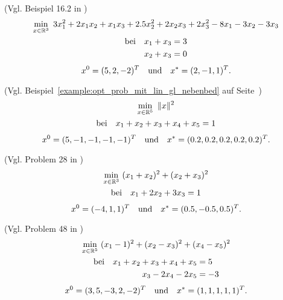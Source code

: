 \begin{testproblem}
\label{test_prob:prob_A_nocedal}
(Vgl. Beispiel 16.2 in \cite[S.~452]{nocedal})
\begin{gather}
\min_{x\in\mathbb{R}^3}\ 3 x_1^2 + 2 x_1 x_2 + x_1 x_3 + 2.5 x_2^2 + 2 x_2 x_3 + 2 x_3^2 - 8 x_1 - 3 x_2 - 3 x_3 \notag \\
\begin{split}
\text{bei}\quad x_1 + x_3 & = 3 \\
x_2 + x_3 & = 0 \\
\end{split}
\end{gather}
\begin{equation*}
x^0 = (5, 2, -2)^T \quad\text{und}\quad x^* = (2, -1, 1)^T.
\end{equation*}
\end{testproblem}

\begin{testproblem}
(Vgl. Beispiel~\ref{example:opt_prob_mit_lin_gl_nebenbed} auf Seite~\pageref{example:opt_prob_mit_lin_gl_nebenbed})
\begin{gather}
\min_{x\in\mathbb{R}^5}\ \| x \|^2 \notag \\
\begin{split}
\text{bei}\quad x_1 + x_2 + x_3 + x_4 + x_5 & = 1 \\
\end{split}
\end{gather}
\begin{equation*}
x^0 = (5, -1, -1, -1, -1)^T \quad\text{und}\quad x^* = (0.2, 0.2, 0.2, 0.2, 0.2)^T.
\end{equation*}
\end{testproblem}

\begin{testproblem}
(Vgl. Problem 28 in \cite[S.~51]{hock})
\begin{gather}
\min_{x\in\mathbb{R}^3}\ (x_1 + x_2)^2 + (x_2 + x_3)^2 \notag \\
\begin{split}
\text{bei}\quad x_1 + 2 x_2 + 3 x_3 & = 1 \\
\end{split}
\end{gather}
\begin{equation*}
x^0 = (-4, 1, 1)^T \quad\text{und}\quad x^* = (0.5, -0.5, 0.5)^T.
\end{equation*}
\end{testproblem}

\begin{testproblem}
(Vgl. Problem 48 in \cite[S.~71]{hock})
\begin{gather}
\min_{x\in\mathbb{R}^5}\ (x_1 - 1)^2 + (x_2 - x_3)^2 + (x_4 - x_5)^2 \notag \\
\begin{split}
\text{bei}\quad x_1 + x_2 + x_3 + x_4 + x_5 & = 5 \\
x_3 - 2 x_4 - 2 x_5 & = -3 \\
\end{split}
\end{gather}
\begin{equation*}
x^0 = (3, 5, -3, 2, -2)^T \quad\text{und}\quad x^* = (1, 1, 1, 1, 1)^T.
\end{equation*}
\end{testproblem}


